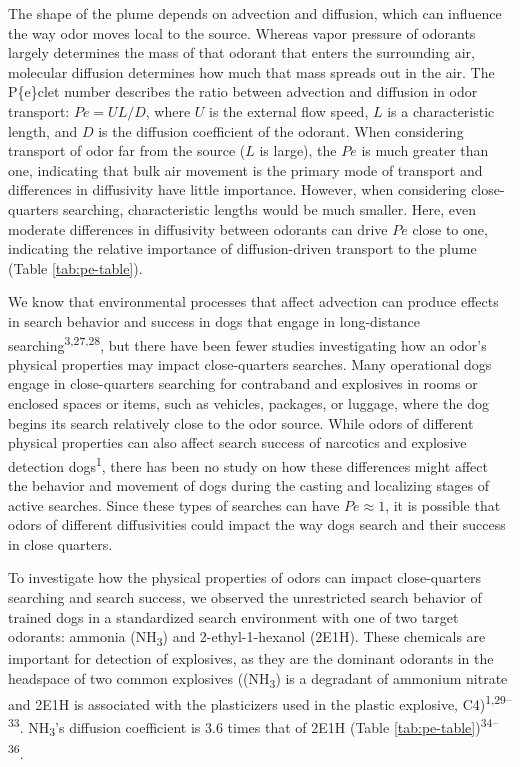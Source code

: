 \documentclass[
]{article}
\begin{document}
The shape of the plume depends on advection and diffusion, which can influence the way odor moves local to the source. Whereas vapor pressure of odorants largely determines the mass of that odorant that enters the surrounding air, molecular diffusion determines how much that mass spreads out in the air. The P\textquotesingle\{e\}clet number describes the ratio between advection and diffusion in odor transport: \(Pe = UL/D\), where \(U\) is the external flow speed, \(L\) is a characteristic length, and \(D\) is the diffusion coefficient of the odorant. When considering transport of odor far from the source (\(L\) is large), the \(Pe\) is much greater than one, indicating that bulk air movement is the primary mode of transport and differences in diffusivity have little importance. However, when considering close-quarters searching, characteristic lengths would be much smaller. Here, even moderate differences in diffusivity between odorants can drive \(Pe\) close to one, indicating the relative importance of diffusion-driven transport to the plume (Table \ref{tab:pe-table}).

We know that environmental processes that affect advection can produce effects in search behavior and success in dogs that engage in long-distance searching\textsuperscript{3,27,28}, but there have been fewer studies investigating how an odor's physical properties may impact close-quarters searches. Many operational dogs engage in close-quarters searching for contraband and explosives in rooms or enclosed spaces or items, such as vehicles, packages, or luggage, where the dog begins its search relatively close to the odor source. While odors of different physical properties can also affect search success of narcotics and explosive detection dogs\textsuperscript{1}, there has been no study on how these differences might affect the behavior and movement of dogs during the casting and localizing stages of active searches. Since these types of searches can have \(Pe \approx 1\), it is possible that odors of different diffusivities could impact the way dogs search and their success in close quarters.

To investigate how the physical properties of odors can impact close-quarters searching and search success, we observed the unrestricted search behavior of trained dogs in a standardized search environment with one of two target odorants: ammonia (NH\textsubscript{3}) and 2-ethyl-1-hexanol (2E1H). These chemicals are important for detection of explosives, as they are the dominant odorants in the headspace of two common explosives ((NH\textsubscript{3}) is a degradant of ammonium nitrate and 2E1H is associated with the plasticizers used in the plastic explosive, C4)\textsuperscript{1,29--33}. NH\textsubscript{3}'s diffusion coefficient is 3.6 times that of 2E1H (Table \ref{tab:pe-table})\textsuperscript{34--36}.
\end{document}
